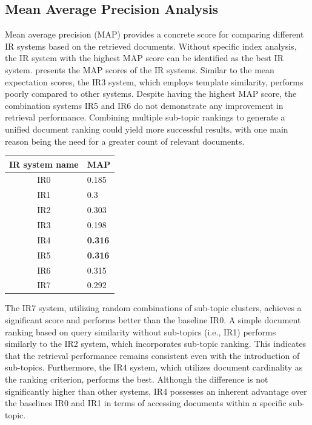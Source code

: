 \subsection{Mean Average Precision Analysis}

Mean average precision (MAP) provides a concrete score for comparing different \ac{IR} systems based on the retrieved documents. Without specific index analysis, the \ac{IR} system with the highest \ac{MAP} score can be identified as the best \ac{IR} system.  presents the \ac{MAP} scores of the \ac{IR} systems. Similar to the mean expectation scores, the IR3 system, which employs template similarity, performs poorly compared to other systems. Despite having the highest \ac{MAP} score, the combination systems IR5 and IR6 do not demonstrate any improvement in retrieval performance. Combining multiple sub-topic rankings to generate a unified document ranking could yield more successful results, with one main reason being the need for a greater count of relevant documents.


\begin{center}
	\label{tab:map_results}
		\begin{tabularx}{0.4\textwidth}{|c|Y|}
		\hline
		IR system name & MAP \\
		\hline
		IR0 & 0.185 \\
		\hline
		IR1 &  0.3 \\
		\hline
		IR2 &  0.303 \\
		\hline
		IR3 &  0.198 \\
		\hline
		IR4 &   \textbf{0.316} \\
		\hline
		IR5 &    \textbf{0.316} \\
		\hline
		IR6 &   0.315\\
		\hline
		IR7 &  0.292 \\
		\hline
	\end{tabularx}
\end{center}


The IR7 system, utilizing random combinations of sub-topic clusters, achieves a significant score and performs better than the baseline IR0. A simple document ranking based on query similarity without sub-topics (i.e., IR1) performs similarly to the IR2 system, which incorporates sub-topic ranking. This indicates that the retrieval performance remains consistent even with the introduction of sub-topics. Furthermore, the IR4 system, which utilizes document cardinality as the ranking criterion, performs the best. Although the difference is not significantly higher than other systems, IR4 possesses an inherent advantage over the baselines IR0 and IR1 in terms of accessing documents within a specific sub-topic.

